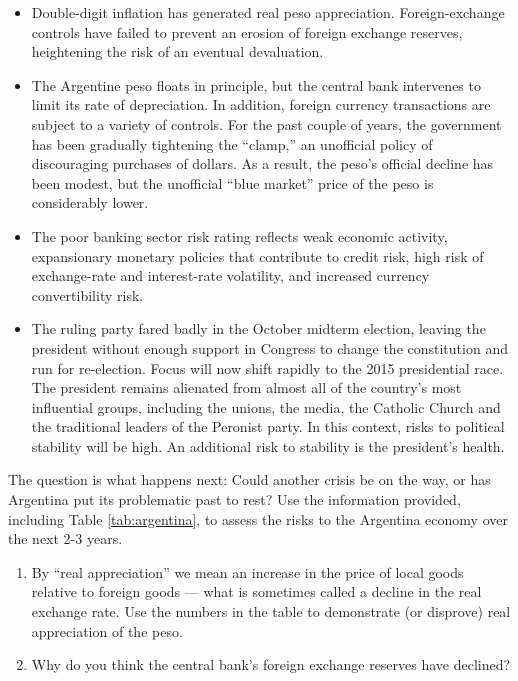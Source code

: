 \begin{enumerate}
\begin{itemize}
\item Double-digit inflation has generated real peso appreciation.
Foreign-exchange controls have failed to prevent an erosion of
foreign exchange reserves,
heightening the risk of an eventual devaluation.

\item The Argentine peso floats in principle, but the central bank intervenes to limit
its rate of depreciation.
In addition, foreign currency transactions are subject to a variety of controls.
For the past couple of years, the government has
been gradually tightening the ``clamp,''
an unofficial policy of discouraging purchases of dollars.
As a result, the peso's official decline has been modest,
but the unofficial ``blue market'' price of the peso is considerably lower.

\item The poor banking sector risk rating reflects weak economic activity, expansionary
monetary policies that contribute to credit risk, high risk of exchange-rate
and interest-rate volatility, and increased currency convertibility risk.

\item The ruling party fared badly in the October midterm election,
 leaving the president without enough support in Congress
 to change the constitution and run for re-election.
 Focus will now shift rapidly to the 2015 presidential race.
 The president remains alienated from almost all of the country's most influential groups,
including the unions, the media, the Catholic Church and the traditional
leaders of the Peronist party. In this context, risks to political stability will be
high. An additional risk to stability is the president's health.
\end{itemize}
%
The question is what happens next:  Could another crisis be on the way,
or has Argentina put its problematic past to rest?
Use the information provided,
including Table \ref{tab:argentina},
to assess the risks to the Argentina economy over the next 2-3 years.
%
\begin{enumerate}
\item By ``real appreciation'' we mean an increase in the price
of local goods relative to foreign goods ---
what is sometimes called a decline in the real exchange rate.
Use the numbers in the table to demonstrate (or disprove) real appreciation
of the peso.

\item Why do you think the central bank's foreign exchange reserves have declined?


\end{enumerate}
\end{enumerate}
